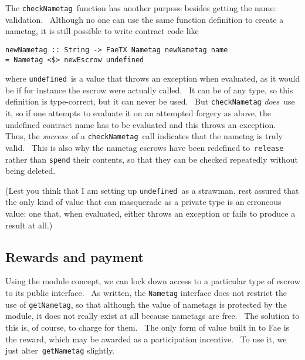 \documentclass[11pt]{article}
\newcommand{\codeblock}[1]{\begin{mdframed}[
    backgroundcolor=header-color,
    linecolor=header-color,
    innertopmargin=10pt,
    ]{\texttt{#1}}\end{mdframed}}
\begin{document}

\vspace{11pt}

The \texttt{checkNametag} function has another purpose besides getting the name: validation.  Although no one can use the same function definition to create a nametag, it is still possible to write contract code like

\codeblock{newNametag :: String -\textgreater{} FaeTX Nametag\newline
newNametag name = Nametag \textless{}\$\textgreater{} newEscrow undefined}

where \texttt{undefined} is a value that throws an exception when evaluated, as it would be if for instance the escrow were actually called.  It can be of any type, so this definition is type-correct, but it can never be used.  But \texttt{checkNametag} \textit{does} use it, so if one attempts to evaluate it on an attempted forgery as above, the undefined contract name has to be evaluated and this throws an exception.  Thus, the \textit{success} of a \texttt{checkNametag} call indicates that the nametag is truly valid.  This is also why the nametag escrows have been redefined to \texttt{release} rather than \texttt{spend} their contents, so that they can be checked repeatedly without being deleted.


\vspace{11pt}

(Lest you think that I am setting up \texttt{undefined} as a strawman, rest assured that the only kind of value that can masquerade as a private type is an erroneous value: one that, when evaluated, either throws an exception or fails to produce a result at all.)

\subsection{Rewards and payment}
\vspace{5.5pt}

Using the module concept, we can lock down access to a particular type of escrow to its public interface.  As written, the \texttt{Nametag} interface does not restrict the use of \texttt{getNametag}, so that although the value of nametags is protected by the module, it does not really exist at all because nametags are free.  The solution to this is, of course, to charge for them.  The only form of value built in to Fae is the reward, which may be awarded as a participation incentive.  To use it, we just alter \texttt{getNametag} slightly.
\end{document}
